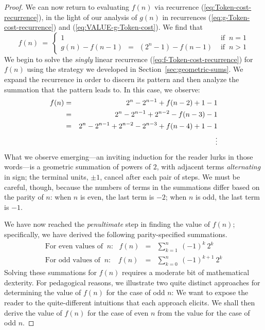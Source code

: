 \begin{proof}
We can now return to evaluating $f(n)$ via recurrence
(\ref{eq:Token-cost-recurrence}), in the light of our analysis of
$g(n)$ in recurrences (\ref{eq:g-Token-cost-recurrence}) and (\ref{eq:VALUE-g-Token-cost}).  We find that 
\begin{equation}
\label{eq:f-Token-cost-recurrence}
f(n) \ = \ \left\{
\begin{array}{ll}
1 & \mbox{ if } \ n=1 \\
g(n) - f(n-1) \ \ = \ \
\left(2^{n} -1\right) - f(n-1) & \mbox{ if } \ n>1
\end{array}
\right.
\end{equation}
We begin to solve the {\em singly} linear recurrence (\ref{eq:f-Token-cost-recurrence}) for $f(n)$ using the strategy we developed in Section~\ref{sec:geometric-sums}.  We expand the recurrence in order to discern its pattern and then analyze the summation that the pattern leads to.  In this case, we observe:
\begin{eqnarray*}
f(n) & = & 2^{n} - 2^{n-1} + f(n-2) + 1 -1 \\
     & = & 2^{n} - 2^{n-1} + 2^{n-2} - f(n-3) -1 \\
     & = & 2^{n} - 2^{n-1} + 2^{n-2} - 2^{n-3} + f(n-4) +1-1 \\
     &    & \hspace*{.35in}  \vdots
\end{eqnarray*}
What we observe emerging---an inviting induction for the reader lurks in those words---is a geometric summation of powers of $2$, with adjacent terms {\em alternating} in sign; the terminal units, $\pm 1$, cancel after each pair of steps.  We must be careful, though, because
the numbers of terms in the summations differ based on the parity of $n$: when $n$ is even, the last term is $-2$; when $n$ is odd, the last term is $-1$.

\smallskip

We have now reached the {\em penultimate} step in finding the value of $f(n)$; specifically, we have derived the following parity-specified summations.
\begin{eqnarray}
\label{eq:EVEN-f-sum}
\mbox{For even values of } \ n: \ \ \
f(n) & = &
\sum_{k=1}^n \ (-1)^{k} \ 2^{k} \\
\label{eq:ODD-f-sum}
\mbox{For odd values of } \ n: \ \ \ \
f(n) & = &
\sum_{k=0}^n \ (-1)^{k+1} \ 2^{k}
\end{eqnarray}
Solving these summations for $f(n)$ requires a moderate bit of mathematical dexterity.  For pedagogical reasons, we illustrate two quite distinct approaches for determining the value of
$f(n)$ for the case of odd $n$:   We want to expose the reader to the quite-different intuitions that each approach elicits.  We shall then derive the value of $f(n)$ for the case of even $n$ from the value for the case of odd $n$.


\end{proof}
